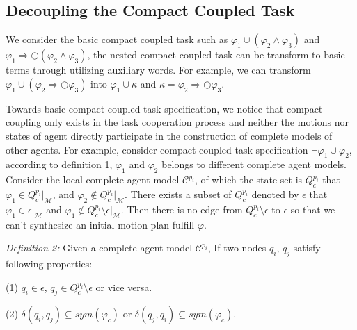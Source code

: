 \documentclass[journal]{IEEEtran}
\begin{document}
\subsection{Decoupling the Compact Coupled Task}
We consider the basic compact coupled task such as $\varphi_1 \cup (\varphi_2 \wedge \varphi_3)$ and $\varphi_1 \Longrightarrow \bigcirc(\varphi_2 \wedge \varphi_3)$, the nested compact coupled task can be transform to basic terms through utilizing auxiliary words. For example, we can transform $\varphi_1 \cup (\varphi_2 \Longrightarrow \bigcirc \varphi_3)$ into $\varphi_1 \cup \kappa$ and $\kappa=\varphi_2 \Longrightarrow \bigcirc \varphi_3$.
\par
Towards basic compact coupled task specification, we notice that compact coupling only exists in the task cooperation process and neither the motions nor states of agent directly participate in the construction of complete models of other agents. For example, consider compact coupled task specification $\neg \varphi_1\cup\varphi_2$, according to definition 1, $\varphi_1$ and $\varphi_2$ belongs to different complete agent models. Consider the local complete agent model $\mathcal{C}^{p_i}$, of which the state set is $Q_c^{p_i}$ that $\varphi_1 \in Q_c^{p_i}|_{\mathcal{M}}$, and $\varphi_2 \notin Q_c^{p_i}|_{\mathcal{M}} $. There exists a subset of $Q_c^{p_i}$ denoted by $\epsilon$ that $\varphi_1 \in \epsilon |_{\mathcal{M}}$ and $\varphi_1 \notin Q_c^{p_i} \setminus \epsilon |_{\mathcal{M}}$. Then there is no edge from $Q_c^{p_i} \setminus \epsilon$ to $\epsilon$ so that we can't synthesize an initial motion plan fulfill $\varphi$.\par
\emph{Definition 2:} Given a complete agent model $\mathcal{C}^{p_i}$, If two nodes $q_i$, $q_j$ satisfy following properties:
\par
(1) $q_i \in \epsilon$, $q_j \in Q_c^{p_i} \setminus \epsilon$ or vice versa.\par
(2) $\delta(q_i,q_j)\subseteq sym(\varphi_c)$ or $\delta(q_j,q_i)\subseteq sym(\varphi_c)$.
\end{document}
